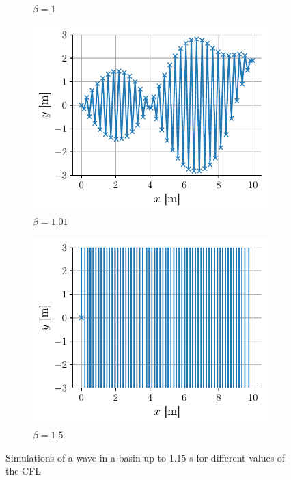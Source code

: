 \begin{figure}[h]
\begin{subfigure}{0.48\linewidth}
        \caption{$\beta = 1$}
        \label{fig:CFL_1}
    \end{subfigure}
    \begin{subfigure}{0.48\linewidth}
        \includegraphics[width=\linewidth]{figures/bassin_default_CFL1.01_1.15s.pdf}
        \caption{$\beta = 1.01$}
        \label{fig:CFL_1.01}
    \end{subfigure}
    \begin{subfigure}{0.48\linewidth}
        \includegraphics[width=\linewidth]{figures/bassin_default_CFL1.5_1.15s.pdf}
        \caption{$\beta = 1.5$}
        \label{fig:CFL_1.5}
    \end{subfigure}
    \caption{Simulations of a wave in a basin up to 1.15 \si{\second} for different values of the CFL}
    \label{fig:CFL_empiric}
\end{figure}


